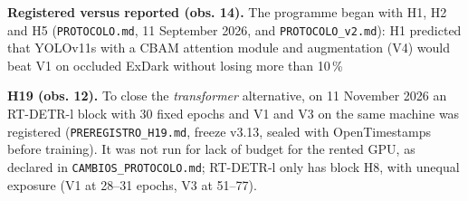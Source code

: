 \noindent\textbf{Registered versus reported (obs. 14).} The programme began with H1, H2 and H5 (\texttt{PROTOCOLO.md}, 11 September 2026, and \texttt{PROTOCOLO\_v2.md}): H1 predicted that YOLOv11s with a CBAM attention module and augmentation (V4) would beat V1 on occluded ExDark without losing more than 10\,\%%

\noindent\textbf{H19 (obs. 12).} To close the \emph{transformer} alternative, on 11 November 2026 an RT-DETR-l block with 30 fixed epochs and V1 and V3 on the same machine was registered (\texttt{PREREGISTRO\_H19.md}, freeze v3.13, sealed with OpenTimestamps before training). It was not run for lack of budget for the rented GPU, as declared in \texttt{CAMBIOS\_PROTOCOLO.md}; RT-DETR-l only has block H8, with unequal exposure (V1 at 28--31 epochs, V3 at 51--77).

